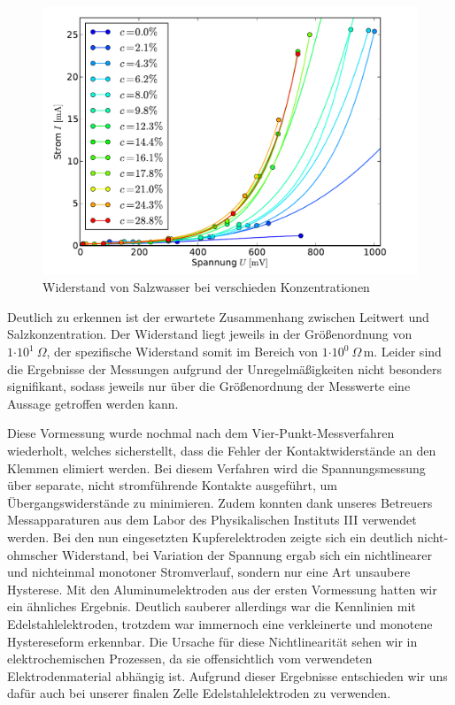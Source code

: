 \documentclass[11pt]{scrartcl}
\newcommand{\unit}[1]{\ensuremath{\,\mathrm{#1}}} %
\newcommand{\ee}[1]{\ensuremath{\cdot\! 10^{#1}}}
\begin{document}
\begin{figure}[ht]
\begin{center}
\includegraphics[width=1.0\textwidth]{images/kennlinien_lin.pdf}
\end{center}
\vspace{-1.5\baselineskip}
\caption{Widerstand von Salzwasser bei verschieden Konzentrationen}
\label{widerstand_vormessung}
\end{figure}

Deutlich zu erkennen ist der erwartete Zusammenhang zwischen Leitwert und Salzkonzentration. Der Widerstand liegt jeweils in der Größenordnung von $1\ee{1} \ \Omega$, der spezifische Widerstand somit im Bereich von $1 \ee{0} \ \Omega\unit{m}$. Leider sind die Ergebnisse der Messungen aufgrund der Unregelmäßigkeiten nicht besonders signifikant, sodass jeweils nur über die Größenordnung der Messwerte eine Aussage getroffen werden kann.

Diese Vormessung wurde nochmal nach dem Vier-Punkt-Messverfahren wiederholt, welches sicherstellt, dass die Fehler der Kontaktwiderstände an den Klemmen elimiert werden. Bei diesem Verfahren wird die Spannungsmessung über separate, nicht stromführende Kontakte ausgeführt, um Übergangswiderstände zu minimieren. Zudem konnten dank unseres Betreuers Messapparaturen aus dem Labor des Physikalischen Instituts III verwendet werden.
Bei den nun eingesetzten Kupferelektroden zeigte sich ein deutlich nicht-ohmscher Widerstand, bei Variation der Spannung ergab sich ein nichtlinearer und nichteinmal monotoner Stromverlauf, sondern nur eine Art unsaubere Hysterese. Mit den Aluminumelektroden aus der ersten Vormessung hatten wir ein ähnliches Ergebnis. Deutlich sauberer allerdings war die Kennlinien mit Edelstahlelektroden, trotzdem war immernoch eine verkleinerte und monotene Hystereseform erkennbar. Die Ursache für diese Nichtlinearität sehen wir in elektrochemischen Prozessen, da sie offensichtlich vom verwendeten Elektrodenmaterial abhängig ist. Aufgrund dieser Ergebnisse entschieden wir uns dafür auch bei unserer finalen Zelle Edelstahlelektroden zu verwenden.
\end{document}
